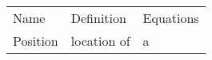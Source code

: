 \documentclass[12pt]{article}
\begin{document}
\begin{table}
	\begin{tabular}{lll}
		Name & Definition & Equations \\
		Position & location of & a
	\end{tabular}
\end{table}
\end{document}
